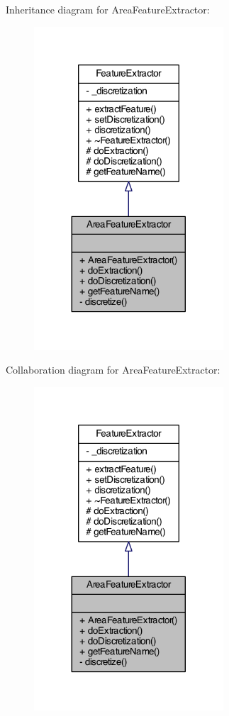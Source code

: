 Inheritance diagram for Area\+Feature\+Extractor\+:\nopagebreak
\begin{figure}[H]
\begin{center}
\leavevmode
\includegraphics[width=200pt]{class_area_feature_extractor__inherit__graph}
\end{center}
\end{figure}


Collaboration diagram for Area\+Feature\+Extractor\+:\nopagebreak
\begin{figure}[H]
\begin{center}
\leavevmode
\includegraphics[width=200pt]{class_area_feature_extractor__coll__graph}
\end{center}
\end{figure}


